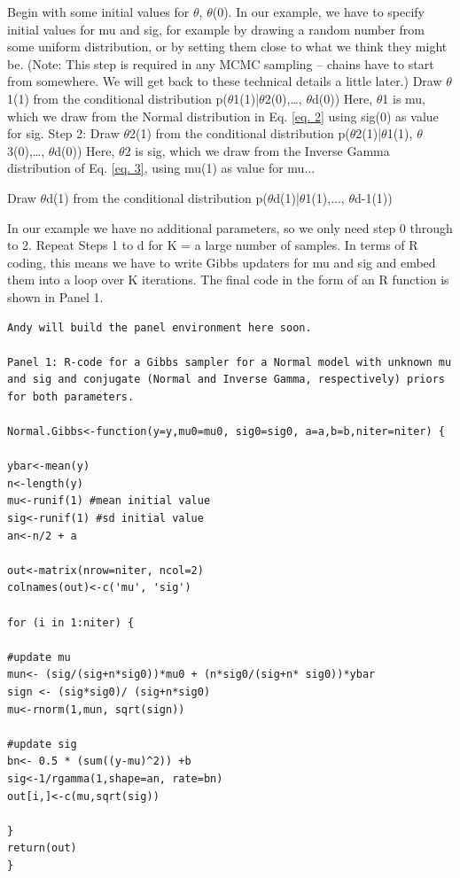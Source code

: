 { Begin with some initial values for $\theta$, $\theta$(0).   }
In our example, we have to specify initial values for mu and sig, for example by drawing a random number from some uniform distribution, or by setting them close to what we think they might be. (Note: This step is required in any MCMC sampling – chains have to start from somewhere. We will get back to these technical details a little later.)
{ Draw $\theta$1(1) from the conditional distribution p($\theta$1(1)|$\theta$2(0),…, $\theta$d(0)) }
Here, $\theta$1 is mu, which we draw from the Normal distribution in Eq. \ref{eq. 2}  using sig(0) as value for sig.
{\flushleft Step 2: Draw $\theta$2(1) from the conditional distribution p($\theta$2(1)|$\theta$1(1), $\theta$3(0),…, $\theta$d(0)) }
Here, $\theta$2 is sig, which we draw from the Inverse Gamma
distribution of Eq. \ref{eq. 3}, using mu(1) as value for mu...

{ Draw $\theta$d(1) from the conditional distribution p($\theta$d(1)|$\theta$1(1),..., $\theta$d-1(1)) }

In our example we have no additional parameters, so we only need step 0 through to 2. 
Repeat Steps 1 to d for K = a large number of samples.
In terms of R coding, this means we have to write Gibbs updaters for mu and sig and embed them into a loop over K iterations. The final code in the form of an R function is shown in Panel 1.

\begin{verbatim}
Andy will build the panel environment here soon.

Panel 1: R-code for a Gibbs sampler for a Normal model with unknown mu
and sig and conjugate (Normal and Inverse Gamma, respectively) priors
for both parameters.

Normal.Gibbs<-function(y=y,mu0=mu0, sig0=sig0, a=a,b=b,niter=niter) {

ybar<-mean(y)
n<-length(y)
mu<-runif(1) #mean initial value
sig<-runif(1) #sd initial value
an<-n/2 + a

out<-matrix(nrow=niter, ncol=2)
colnames(out)<-c('mu', 'sig')

for (i in 1:niter) {

#update mu
mun<- (sig/(sig+n*sig0))*mu0 + (n*sig0/(sig+n* sig0))*ybar 
sign <- (sig*sig0)/ (sig+n*sig0)
mu<-rnorm(1,mun, sqrt(sign))

#update sig
bn<- 0.5 * (sum((y-mu)^2)) +b
sig<-1/rgamma(1,shape=an, rate=bn)
out[i,]<-c(mu,sqrt(sig))

}
return(out)
}
\end{verbatim}

